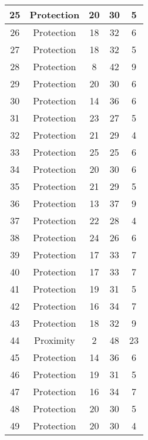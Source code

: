 \documentclass[results.tex]{subfiles}
\begin{document}
\begin{center}
\begin{tabular}{| c || c | c | c | c |}
    \hline
    25 & Protection & 20 & 30 & 5 \\ 
    \hline
    26 & Protection & 18 & 32 & 6 \\ 
    \hline
    27 & Protection & 18 & 32 & 5 \\ 
    \hline
    28 & Protection & 8 & 42 & 9 \\ 
    \hline
    29 & Protection & 20 & 30 & 6 \\ 
    \hline
    30 & Protection & 14 & 36 & 6 \\ 
    \hline
    31 & Protection & 23 & 27 & 5 \\ 
    \hline
    32 & Protection & 21 & 29 & 4 \\ 
    \hline
    33 & Protection & 25 & 25 & 6 \\ 
    \hline
    34 & Protection & 20 & 30 & 6 \\ 
    \hline
    35 & Protection & 21 & 29 & 5 \\ 
    \hline
    36 & Protection & 13 & 37 & 9 \\ 
    \hline
    37 & Protection & 22 & 28 & 4 \\ 
    \hline
    38 & Protection & 24 & 26 & 6 \\ 
    \hline
    39 & Protection & 17 & 33 & 7 \\ 
    \hline
    40 & Protection & 17 & 33 & 7 \\ 
    \hline
    41 & Protection & 19 & 31 & 5 \\ 
    \hline
    42 & Protection & 16 & 34 & 7 \\ 
    \hline
    43 & Protection & 18 & 32 & 9 \\ 
    \hline
    44 & Proximity & 2 & 48 & 23 \\ 
    \hline
    45 & Protection & 14 & 36 & 6 \\ 
    \hline
    46 & Protection & 19 & 31 & 5 \\ 
    \hline
    47 & Protection & 16 & 34 & 7 \\ 
    \hline
    48 & Protection & 20 & 30 & 5 \\ 
    \hline
    49 & Protection & 20 & 30 & 4 \\ 
    \hline   \end{tabular}
\end{center}
\end{document}
